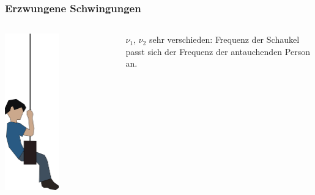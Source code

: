 \documentclass{beamer}
\begin{document}
\begin{frame}
\frametitle{Erzwungene Schwingungen}

\begin{columns}[c]

\begin{column}{3cm}

\begin{center}
\includegraphics[width=0.5\textwidth]{kind_schaukel.png}
\end{center}

\end{column}

\begin{column}{7cm}

\(\nu_1\), \(\nu_2\) sehr verschieden: Frequenz der Schaukel passt sich der Frequenz der antauchenden Person an. \\


\end{column}
\end{columns}
\end{frame}
\end{document}
